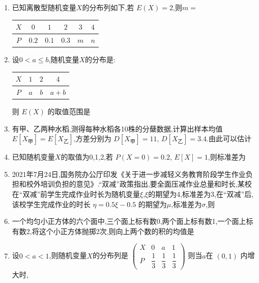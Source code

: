 \begin{enumerate}
\item 已知离散型随机变量$X$的分布列如下,若 $E(X)=2$,则$m=$
\begin{center}
\begin{tabular}{|c|c|c|c|c|c|}
\hline
$X$ & $0$ & $1$ & $2$ & $3$ & $4$ \\
\hline
$P$ & $0.2$ & $0.1$ & $0.3$ & $m$ & $n$ \\
\hline
\end{tabular}
\end{center}

\item 设$0<a\le b$,随机变量$X$的分布是:
\begin{center}
\begin{tabular}{|c|c|c|c|}
\hline
$X$ & $1$ & $2$ & $4$ \\
\hline
$P$ & $a$ & $b$ & $a+b$ \\
\hline
\end{tabular}
\end{center}
则 $E(X)$ 的取值范围是\blkda{$[\dfrac{11}{4},3)$}

\item 有甲、乙两种水稻,测得每种水稻各10株的分蘖数据,计算出样本均值$E[X_{\text{甲}}]=E[X_{\text{乙}}]$,方差分别为 $D[X_{\text{甲}}]=11$, $D[X_{\text{乙}}]=3.4$.由此可以估计 

\item 已知随机变量$X$的取值为0,1,2,若 $P(X=0)=0.2$, $E[X]=1$,则标准差为

\item 2021年7月24日,国务院办公厅印发《关于进一步减轻义务教育阶段学生作业负担和校外培训负担的意见》.“双减”政策指出,要全面压减作业总量和时长,某校在“双减”前学生完成作业时长为随机变量$\xi$,$\xi$的期望为4,标准差为3,在“双减”后,该校学生完成作业的时长 $\eta=0.5\xi-0.5$ 的期望为$\mu$,标准差为$\sigma$,则

\item 一个均匀小正方体的六个面中,三个面上标有数0,两个面上标有数1,一个面上标有数2,将这个小正方体抛掷2次,则向上两个数的积的均值是

\item 设$0<a<1$,则随机变量$X$的分布列是 $\begin{pmatrix}X&0&a&1\\ P&\dfrac{1}{3}&\dfrac{1}{3}&\dfrac{1}{3}\end{pmatrix}$ 则当$a$在 $(0,1)$ 内增大时,


\end{enumerate}
